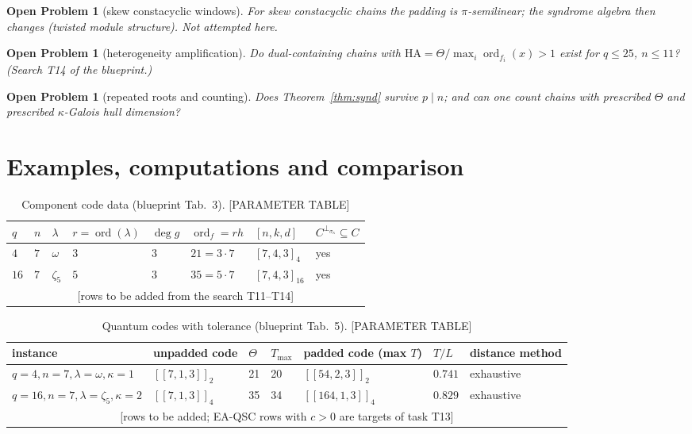 \documentclass[11pt]{article}
\theoremstyle{definition}
\theoremstyle{remark}
\theoremstyle{plain}
\newtheorem{openproblem}[theorem]{Open Problem}
\newcommand{\ord}{\operatorname{ord}}
\newcommand{\perpsig}{^{\perp_{\sigma_\kappa}}}
\newcommand{\Tol}{T}
\newcommand{\Th}{\Theta}
\begin{document}
\begin{openproblem}[skew constacyclic windows]\label{op:skew}
For skew constacyclic chains the padding is $\pi$-semilinear; the syndrome algebra then changes
(twisted module structure). Not attempted here.
\end{openproblem}

\begin{openproblem}[heterogeneity amplification]\label{op:ha}
Do dual-containing chains with $\mathrm{HA}=\Th/\max_i\ord_{f_i}(x)>1$ exist for $q\le25$,
$n\le11$? (Search T14 of the blueprint.)
\end{openproblem}

\begin{openproblem}[repeated roots and counting]\label{op:repeated}
Does Theorem~\ref{thm:synd} survive $p\mid n$; and can one count chains with prescribed $\Th$
and prescribed $\kappa$-Galois hull dimension?
\end{openproblem}

\section{Examples, computations and comparison}\label{sec:examples}

\begin{table}[t]\centering
\caption{Component code data (blueprint Tab.~3). [PARAMETER TABLE]}
\begin{tabular}{@{}llllllll@{}}\toprule
$q$ & $n$ & $\lambda$ & $r=\ord(\lambda)$ & $\deg g$ & $\ord_f=r h$ & $[n,k,d]$ & $C\perpsig\subseteq C$\\\midrule
$4$ & $7$ & $\omega$ & $3$ & $3$ & $21=3\cdot7$ & $[7,4,3]_4$ & yes\\
$16$ & $7$ & $\zeta_5$ & $5$ & $3$ & $35=5\cdot7$ & $[7,4,3]_{16}$ & yes\\
\multicolumn{8}{c}{[rows to be added from the search T11--T14]}\\\bottomrule
\end{tabular}
\end{table}

\begin{table}[t]\centering
\caption{Quantum codes with tolerance (blueprint Tab.~5). [PARAMETER TABLE]}
\label{tab:qcodes}
\begin{tabular}{@{}lllllll@{}}\toprule
instance & unpadded code & $\Th$ & $\Tol_{\max}$ & padded code (max $\Tol$) & $\Tol/L$ & distance method\\\midrule
$q=4,n=7,\lambda=\omega,\kappa=1$ & $[[7,1,3]]_2$ & 21 & 20 & $[[54,2,3]]_2$ & $0.741$ & exhaustive\\
$q=16,n=7,\lambda=\zeta_5,\kappa=2$ & $[[7,1,3]]_4$ & 35 & 34 & $[[164,1,3]]_4$ & $0.829$ & exhaustive\\
\multicolumn{7}{c}{[rows to be added; EA-QSC rows with $c>0$ are targets of task T13]}\\\bottomrule
\end{tabular}
\end{table}
\end{document}
